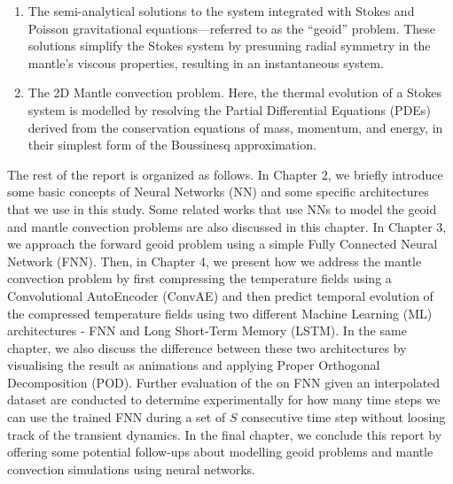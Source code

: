 \begin{enumerate}
    \item The semi-analytical solutions to the system integrated with Stokes and Poisson gravitational equations—referred to as the ``geoid'' problem. These solutions simplify the Stokes system by presuming radial symmetry in the mantle's viscous properties, resulting in an instantaneous system.

    \item The 2D Mantle convection problem. Here, the thermal evolution of a Stokes system is modelled by resolving the Partial Differential Equations (PDEs) derived from the conservation equations of mass, momentum, and energy, in their simplest form of the Boussinesq approximation. 
\end{enumerate}

The rest of the report is organized as follows. In Chapter 2, we briefly introduce some basic concepts of Neural Networks (NN) and some specific architectures that we use in this study. Some related works that use NNs to model the geoid and mantle convection problems are also discussed in this chapter. In Chapter 3, we approach the forward geoid problem using a simple Fully Connected Neural Network (FNN). Then, in Chapter 4, we present how we address the mantle convection problem by first compressing the temperature fields using a Convolutional AutoEncoder (ConvAE) and then predict temporal evolution of the compressed temperature fields using two different Machine Learning (ML) architectures - FNN and Long Short-Term Memory (LSTM). In the same chapter, we also discuss the difference between these two architectures by visualising the result as animations and applying Proper Orthogonal Decomposition (POD). Further evaluation of the on FNN given an interpolated dataset are conducted to determine experimentally for how many time steps we can use the trained FNN during a set of $S$ consecutive time step without loosing track of the transient dynamics. In the final chapter, we conclude this report by offering some potential follow-ups about modelling geoid problems and mantle convection simulations using neural networks.